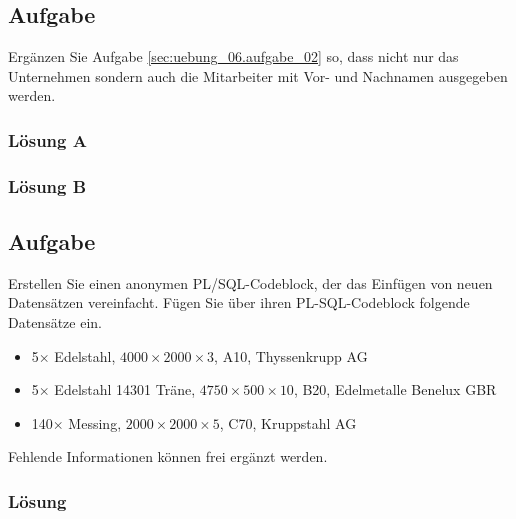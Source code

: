 \subsection{Aufgabe}
\label{sec:uebung_06.aufgabe_03}
Ergänzen Sie Aufgabe \ref{sec:uebung_06.aufgabe_02} so, dass nicht nur das Unternehmen sondern auch die Mitarbeiter mit Vor- und Nachnamen ausgegeben werden.

\subsubsection*{Lösung A}
\label{sec:uebung_06.aufgabe_03.loesung.A}

\subsubsection*{Lösung B}
\label{sec:uebung_06.aufgabe_03.loesung.B}


\subsection{Aufgabe}
\label{sec:uebung_06.aufgabe_04}
Erstellen Sie einen anonymen PL/SQL-Codeblock, der das Einfügen von neuen Datensätzen vereinfacht.
Fügen Sie über ihren PL-SQL-Codeblock folgende Datensätze ein.

\begin{itemize}[itemsep=0pt]
  \item 5$\times$ Edelstahl, $4000\times2000\times3$, A10, Thyssenkrupp AG
  \item 5$\times$ Edelstahl 14301 Träne, $4750\times500\times10$, B20, Edelmetalle Benelux GBR
  \item 140$\times$ Messing, $2000\times2000\times5$, C70, Kruppstahl AG
\end{itemize}

Fehlende Informationen können frei ergänzt werden.

\subsubsection*{Lösung}
\label{sec:uebung_06.aufgabe_04.loesung}
